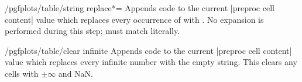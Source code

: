 \documentclass[a4paper]{ltxdoc}
\begin{document}
\begin{stylekey}{/pgfplots/table/string replace*=}
    Appends code to the current |preproc cell content| value which replaces
    every occurrence of  with . No expansion is
    performed during this step;  must match literally.
\begin{codeexample}[]
\end{codeexample}
\end{stylekey}

\begin{stylekey}{/pgfplots/table/clear infinite}
    Appends code to the current |preproc cell content| value which replaces
    every infinite number with the empty string. This clears any cells with
    $\pm \infty$ and NaN.
\end{stylekey}
\end{document}
